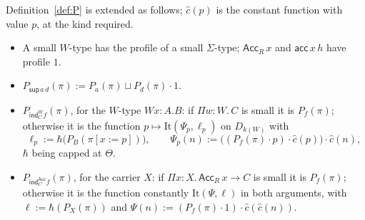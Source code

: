 \documentclass[10pt]{article}
\newcommand{\ind}{\mathsf{ind}}
\newcommand{\Acc}{\mathsf{Acc}}
\begin{document}
\begin{definition}\label{def:P2}
Definition~\ref{def:P} is extended as follows; $\hat c(p)$ is the constant
function with value $p$, at the kind required.
\begin{itemize}
\item A small $W$-type has the profile of a small $\Sigma$-type;
  $\Acc_R\,x$ and $\mathsf{acc}\,x\,h$ have profile $1$.
\item $P_{\mathsf{sup}\,a\,d}(\pi):=P_a(\pi)\sqcup P_d(\pi)\cdot1$.
\item $P_{\ind^W_Cf}(\pi)$, for the $W$-type $Wx{:}A.B$: if
  $\Pi w{:}W.\,C$ is small it is $P_f(\pi)$; otherwise it is the function
  $p\mapsto\mathrm{It}(\Psi_p,\ell_p)$ on $D_{k(W)}$ with
  \[
  \ell_p:=\hbar\bigl(P_B(\pi[x{:=}p])\bigr),\qquad
  \Psi_p(n):=\bigl((P_f(\pi)\cdot p)\cdot\hat c(p)\bigr)\cdot\hat c(n),
  \]
  $\hbar$ being capped at $\Theta$.
\item $P_{\ind^{\Acc}_Cf}(\pi)$, for the carrier $X$: if
  $\Pi x{:}X.\,\Acc_R\,x\to C$ is small it is $P_f(\pi)$; otherwise it is
  the function constantly $\mathrm{It}(\Psi,\ell)$ in both arguments,
  with $\ell:=\hbar(P_X(\pi))$ and
  $\Psi(n):=(P_f(\pi)\cdot1)\cdot\hat c(\hat c(n))$.
\end{itemize}
\end{definition}
\end{document}
